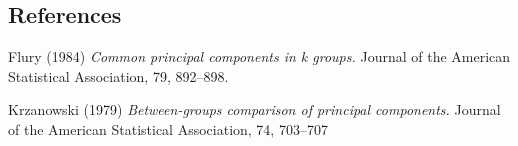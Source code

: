 \documentclass[12pt]{article}
\begin{document}
%        
%
%        

\subsection*{References}

\begin{description}

\item
Flury (1984)
\textit{Common principal components in k groups.}
Journal of the American Statistical Association, 79, 892--898.
\item
Krzanowski (1979)
\textit{Between-groups comparison of principal components.}
Journal of the American Statistical Association, 74, 703--707

\end{description}
\end{document}
